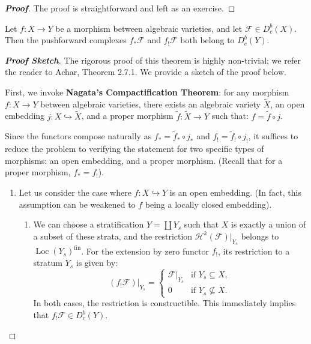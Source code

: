 \begin{proof}[\textbf{Proof}]
The proof is straightforward and left as an exercise.
\end{proof}

\begin{theorem}
Let $f \colon X \longrightarrow Y$ be a morphism between algebraic varieties, and let $\mathcal{F} \in D^b_c(X)$. Then the pushforward complexes $f_* \mathcal{F}$ and $f_! \mathcal{F}$ both belong to $D^b_c(Y)$.
\end{theorem}

\begin{proof}[\textbf{Proof Sketch}]
The rigorous proof of this theorem is highly non-trivial; we refer the reader to Achar, Theorem 2.7.1. We provide a sketch of the proof below.

First, we invoke \textbf{Nagata's Compactification Theorem}: for any morphism $f \colon X \longrightarrow Y$ between algebraic varieties, there exists an algebraic variety $\tilde{X}$, an open embedding $j \colon X \hookrightarrow \tilde{X}$, and a proper morphism $\tilde{f} \colon \tilde{X} \longrightarrow Y$ such that:
$f = \tilde{f} \circ j$.

Since the functors compose naturally as $f_* = \tilde{f}_* \circ j_*$ and $f_! = \tilde{f}_! \circ j_!$, it suffices to reduce the problem to verifying the statement for two specific types of morphisms: an open embedding, and a proper morphism. (Recall that for a proper morphism, $f_* = f_!$).

\begin{enumerate}
    \item Let us consider the case where $f \colon X \hookrightarrow Y$ is an open embedding. (In fact, this assumption can be weakened to $f$ being a locally closed embedding). 
\begin{enumerate}
    \item We can choose a stratification $Y = \coprod Y_s$ such that $X$ is exactly a union of a subset of these strata, and the restriction $\mathcal{H}^k(\mathcal{F})|_{Y_s}$ belongs to $\operatorname{Loc}(Y_s)^{\text{fin}}$. For the extension by zero functor $f_!$, its restriction to a stratum $Y_s$ is given by:
\begin{equation*}
    (f_! \mathcal{F})|_{Y_s} = 
    \begin{cases} 
        \mathcal{F}|_{Y_s} & \text{if } Y_s \subseteq X, \\ 
        0 & \text{if } Y_s \not\subseteq X. 
    \end{cases}
\end{equation*}
In both cases, the restriction is constructible. This immediately implies that $f_! \mathcal{F} \in D^b_c(Y)$.


\end{enumerate}
\end{enumerate}
\end{proof}
